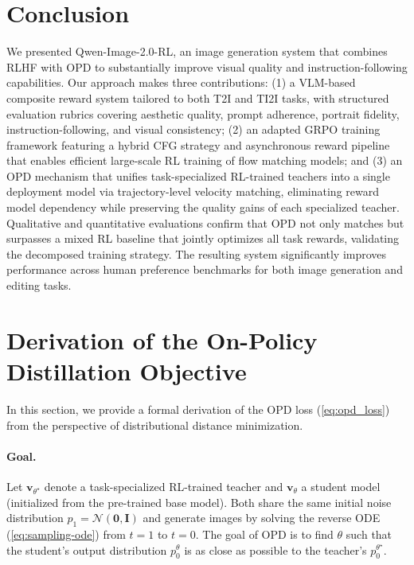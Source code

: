 \documentclass{llmxive}
\providecommand{\bm}[1]{\boldsymbol{#1}}
\providecommand{\mathbf}[1]{\bm{#1}}
\begin{document}
\section{Conclusion}

We presented Qwen-Image-2.0-RL, an image generation system that combines RLHF with OPD to substantially improve visual quality and instruction-following capabilities. Our approach makes three contributions: (1) a VLM-based composite reward system tailored to both T2I and TI2I tasks, with structured evaluation rubrics covering aesthetic quality, prompt adherence, portrait fidelity, instruction-following, and visual consistency; (2) an adapted GRPO training framework featuring a hybrid CFG strategy and asynchronous reward pipeline that enables efficient large-scale RL training of flow matching models; and (3) an OPD mechanism that unifies task-specialized RL-trained teachers into a single deployment model via trajectory-level velocity matching, eliminating reward model dependency while preserving the quality gains of each specialized teacher. Qualitative and quantitative evaluations confirm that OPD not only matches but surpasses a mixed RL baseline that jointly optimizes all task rewards, validating the decomposed training strategy. The resulting system significantly improves performance across human preference benchmarks for both image generation and editing tasks.



\appendix

\section{Derivation of the On-Policy Distillation Objective}
\label{app:opd_derivation}

In this section, we provide a formal derivation of the OPD loss (\cref{eq:opd_loss}) from the perspective of distributional distance minimization.

\paragraph{Goal.} Let $\mathbf{v}_{\theta^\star}$ denote a task-specialized RL-trained teacher and $\mathbf{v}_\theta$ a student model (initialized from the pre-trained base model). Both share the same initial noise distribution $p_1 = \mathcal{N}(\mathbf{0}, \mathbf{I})$ and generate images by solving the reverse ODE (\cref{eq:sampling-ode}) from $t=1$ to $t=0$. The goal of OPD is to find $\theta$ such that the student's output distribution $p_0^\theta$ is as close as possible to the teacher's $p_0^{\theta^\star}$.
\end{document}
